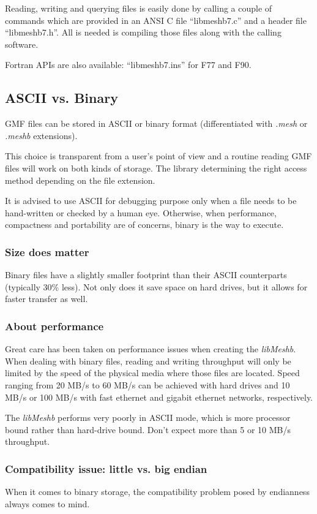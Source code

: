 \documentclass[a4paper,12pt]{article}
\begin{document}
Reading, writing and querying files is easily done by calling a couple of commands which are provided in an ANSI C file ``libmeshb7.c'' and a header file ``libmeshb7.h''. All is needed is compiling those files along with the calling software.

Fortran APIs are also available: ``libmeshb7.ins'' for F77 and F90.


\subsection{ASCII vs. Binary}
GMF files can be stored in ASCII or binary format (differentiated with \emph{.mesh} or \emph{.meshb} extensions).

This choice is transparent from a user's point of view and a routine reading GMF files will work on both kinds of storage.
The library determining the right access method depending on the file extension.

It is advised to use ASCII for debugging purpose only when a file needs to be hand-written or checked by a human eye. Otherwise, when performance, compactness and portability are of concerns, binary is the way to execute.


\subsubsection{Size does matter}
Binary files have a slightly smaller footprint than their ASCII counterparts (typically 30\% less). Not only does it save space on hard drives, but it allows for faster transfer as well.


\subsubsection{About performance}
Great care has been taken on performance issues when creating the \emph{libMeshb}. When dealing with binary files, reading and writing throughput will only be limited by the speed of the physical media where those files are located. Speed ranging from 20 MB/s to 60 MB/s can be achieved with hard drives and 10 MB/s or 100 MB/s with fast ethernet and gigabit ethernet networks, respectively.

The \emph{libMeshb} performs very poorly in ASCII mode, which is more processor bound rather than hard-drive bound. Don't expect more than 5 or 10 MB/s throughput.

\subsubsection{Compatibility issue: little vs. big endian}
When it comes to binary storage, the compatibility problem posed by endianness always comes to mind.
\end{document}

